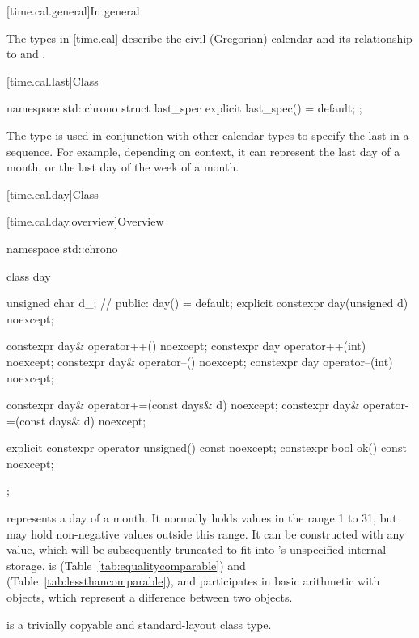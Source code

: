 [time.cal.general]{In general}

\pnum
The types in \ref{time.cal} describe the civil (Gregorian) calendar
and its relationship to  and .

[time.cal.last]{Class }
%

\begin{codeblock}
namespace std::chrono {
  struct last_spec {
    explicit last_spec() = default;
  };
}
\end{codeblock}

\pnum
The type  is used
in conjunction with other calendar types
to specify the last in a sequence.
For example, depending on context,
it can represent the last day of a month,
or the last day of the week of a month.

[time.cal.day]{Class }

[time.cal.day.overview]{Overview}

\begin{codeblock}
namespace std::chrono {
  class day {
    unsigned char d_;           // \expos
  public:
    day() = default;
    explicit constexpr day(unsigned d) noexcept;

    constexpr day& operator++()    noexcept;
    constexpr day  operator++(int) noexcept;
    constexpr day& operator--()    noexcept;
    constexpr day  operator--(int) noexcept;

    constexpr day& operator+=(const days& d) noexcept;
    constexpr day& operator-=(const days& d) noexcept;

    explicit constexpr operator unsigned() const noexcept;
    constexpr bool ok() const noexcept;
  };
}
\end{codeblock}

\pnum
{} represents a day of a month.
It normally holds values in the range 1 to 31,
but may hold non-negative values outside this range.
It can be constructed with any  value,
which will be subsequently truncated to fit into 's unspecified internal storage.
 is  (Table~\ref{tab:equalitycomparable})
and  (Table~\ref{tab:lessthancomparable}),
and participates in basic arithmetic with  objects,
which represent a difference between two  objects.

\pnum
{} is a trivially copyable and standard-layout class type.

